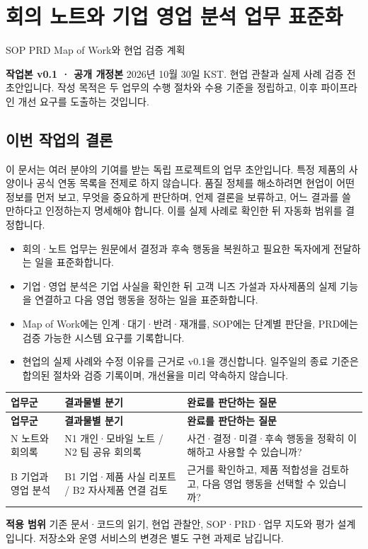 \documentclass[a4paper,10pt]{article}
\newcommand{\Hline}{\noalign{\hrule height 1.5pt}}
\begin{document}
\section*{회의 노트와 기업 영업 분석 업무 표준화}
SOP PRD Map of Work와 현업 검증 계획


\noindent\textbf{작업본 v0.1 · 공개 개정본} 2026년 10월 30일 KST. 현업 관찰과 실제 사례 검증 전 초안입니다. 작성 목적은 두 업무의 수행 절차와 수용 기준을 정립하고, 이후 파이프라인 개선 요구를 도출하는 것입니다.


\subsection*{이번 작업의 결론}
이 문서는 여러 분야의 기여를 받는 독립 프로젝트의 업무 초안입니다. 특정 제품의 사양이나 공식 연동 목록을 전제로 하지 않습니다. 품질 정체를 해소하려면 현업이 어떤 정보를 먼저 보고, 무엇을 중요하게 판단하며, 언제 결론을 보류하고, 어느 결과를 쓸 만하다고 인정하는지 명세해야 합니다. 이를 실제 사례로 확인한 뒤 자동화 범위를 결정합니다.


\begin{itemize}
\item 회의·노트 업무는 원문에서 결정과 후속 행동을 복원하고 필요한 독자에게 전달하는 일을 표준화합니다.
\item 기업·영업 분석은 기업 사실을 확인한 뒤 고객 니즈 가설과 자사제품의 실제 기능을 연결하고 다음 영업 행동을 정하는 일을 표준화합니다.
\item Map of Work에는 인계·대기·반려·재개를, SOP에는 단계별 판단을, PRD에는 검증 가능한 시스템 요구를 기록합니다.
\item 현업의 실제 사례와 수정 이유를 근거로 v0.1을 갱신합니다. 일주일의 종료 기준은 합의된 절차와 검증 기록이며, 개선율을 미리 약속하지 않습니다.
\end{itemize}
{\fontsize{9.2}{13.616}\selectfont
\begin{longtable}{!{\vrule width 1.5pt}L{31.56mm}|L{58.39mm}|L{67.85mm}!{\vrule width 1.5pt}}
\Hline{} \textbf{업무군} & \textbf{결과물별 분기} & \textbf{완료를 판단하는 질문}\\\hline\endfirsthead
\Hline{} \textbf{업무군} & \textbf{결과물별 분기} & \textbf{완료를 판단하는 질문}\\\hline\endhead
\hline\endfoot\Hline\endlastfoot
N 노트와 회의록 & N1 개인·모바일 노트 / N2 팀 공유 회의록 & 사건·결정·미결·후속 행동을 정확히 이해하고 사용할 수 있습니까?\\\hline
B 기업과 영업 분석 & B1 기업·제품 사실 리포트 / B2 자사제품 연결 검토 & 근거를 확인하고, 제품 적합성을 검토하고, 다음 영업 행동을 선택할 수 있습니까?\\\hline
\end{longtable}}
\noindent\textbf{적용 범위} 기존 문서·코드의 읽기, 현업 관찰안, SOP·PRD·업무 지도와 평가 설계입니다. 저장소와 운영 서비스의 변경은 별도 구현 과제로 남깁니다.
\end{document}
